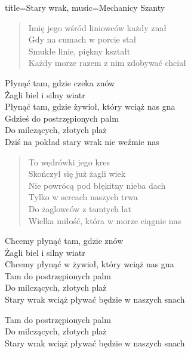 \begin{song}{title={Stary wrak}, music={Mechanicy Szanty}}
\begin{multicols}{2}
\begin{verse}
        Imię jego wśród liniowców każdy znał \\
        Gdy na cumach w porcie stał \\
        Smukłe linie, piękny kształt \\
        Każdy morze razem z nim zdobywać chciał
    \end{verse}
    \begin{chorus*}
        Płynąć tam, gdzie czeka znów \\
        Żagli biel i silny wiatr \\
        Płynąć tam, gdzie żywioł, który wciąż nas gna \\
        Gdzieś do postrzępionych palm \\
        Do milczących, złotych plaż \\
        Dziś na pokład stary wrak nie weźmie nas
    \end{chorus*}
    \begin{verse}
        To wędrówki jego kres \\
        Skończył się już żagli wiek \\
        Nie powrócą pod błękitny nieba dach \\
        Tylko w sercach naszych trwa \\
        Do żaglowców z tamtych lat \\
        Wielka miłość, która w morze ciągnie nas
    \end{verse}
    \begin{chorus*}
        Chcemy płynąć tam, gdzie znów \\
        Żagli biel i silny wiatr \\
        Chcemy płynąć w żywioł, który wciąż nas gna \\
        Tam do postrzępionych palm \\
        Do milczących, złotych plaż \\
        Stary wrak wciąż pływać będzie w naszych snach
    \end{chorus*}
    \begin{interlude}
        Tam do postrzępionych palm \\
        Do milczących, złotych plaż \\
        Stary wrak wciąż pływać będzie w naszych snach
    \end{interlude}
    \end{multicols}
\end{song}

